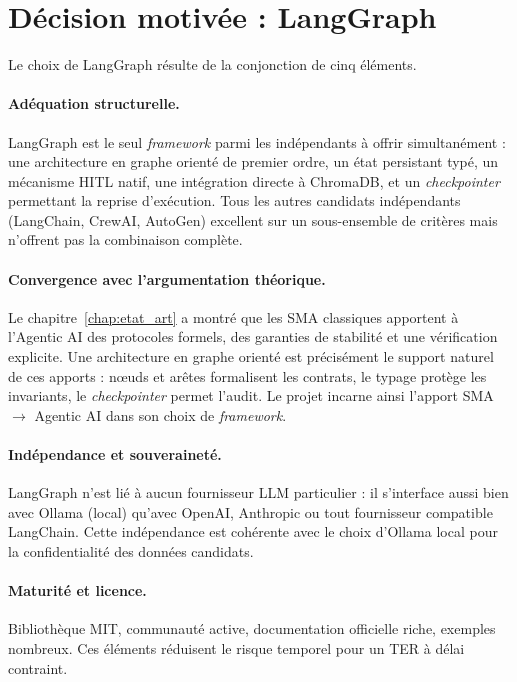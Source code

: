\section{Décision motivée : LangGraph}
\label{sec:decision}

Le choix de LangGraph résulte de la conjonction de cinq éléments.

\paragraph{Adéquation structurelle.}
LangGraph est le seul \emph{framework} parmi les indépendants à offrir simultanément : une architecture en graphe orienté de premier ordre, un état persistant typé, un mécanisme HITL natif, une intégration directe à ChromaDB, et un \emph{checkpointer} permettant la reprise d'exécution. Tous les autres candidats indépendants (LangChain, CrewAI, AutoGen) excellent sur un sous-ensemble de critères mais n'offrent pas la combinaison complète.

\paragraph{Convergence avec l'argumentation théorique.}
Le chapitre~\ref{chap:etat_art} a montré que les SMA classiques apportent à l'Agentic AI des protocoles formels, des garanties de stabilité et une vérification explicite. Une architecture en graphe orienté est précisément le support naturel de ces apports : nœuds et arêtes formalisent les contrats, le typage protège les invariants, le \emph{checkpointer} permet l'audit. Le projet incarne ainsi l'apport SMA $\rightarrow$ Agentic AI dans son choix de \emph{framework}.

\paragraph{Indépendance et souveraineté.}
LangGraph n'est lié à aucun fournisseur LLM particulier : il s'interface aussi bien avec Ollama (local) qu'avec OpenAI, Anthropic ou tout fournisseur compatible LangChain. Cette indépendance est cohérente avec le choix d'Ollama local pour la confidentialité des données candidats.

\paragraph{Maturité et licence.}
Bibliothèque MIT, communauté active, documentation officielle riche, exemples nombreux. Ces éléments réduisent le risque temporel pour un TER à délai contraint.

